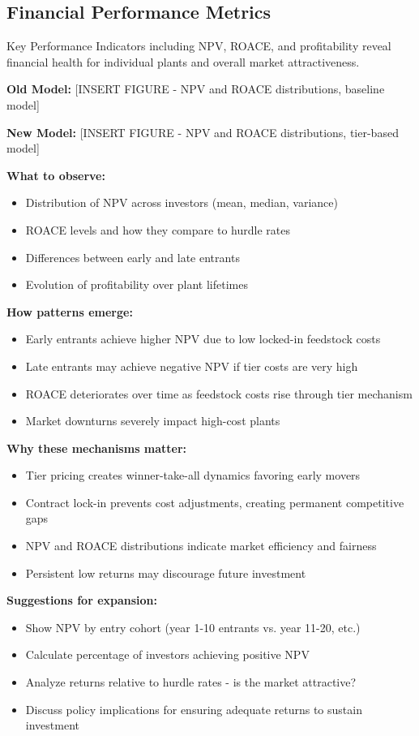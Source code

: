 \documentclass[10.5pt]{article}
\begin{document}
\subsection{Financial Performance Metrics}

Key Performance Indicators including NPV, ROACE, and profitability reveal financial health for individual plants and overall market attractiveness.

\textbf{Old Model:} [INSERT FIGURE - NPV and ROACE distributions, baseline model]

\textbf{New Model:} [INSERT FIGURE - NPV and ROACE distributions, tier-based model]

\textbf{What to observe:}
\begin{itemize}
    \item Distribution of NPV across investors (mean, median, variance)
    \item ROACE levels and how they compare to hurdle rates
    \item Differences between early and late entrants
    \item Evolution of profitability over plant lifetimes
\end{itemize}

\textbf{How patterns emerge:}
\begin{itemize}
    \item Early entrants achieve higher NPV due to low locked-in feedstock costs
    \item Late entrants may achieve negative NPV if tier costs are very high
    \item ROACE deteriorates over time as feedstock costs rise through tier mechanism
    \item Market downturns severely impact high-cost plants
\end{itemize}

\textbf{Why these mechanisms matter:}
\begin{itemize}
    \item Tier pricing creates winner-take-all dynamics favoring early movers
    \item Contract lock-in prevents cost adjustments, creating permanent competitive gaps
    \item NPV and ROACE distributions indicate market efficiency and fairness
    \item Persistent low returns may discourage future investment
\end{itemize}

\textbf{Suggestions for expansion:}
\begin{itemize}
    \item Show NPV by entry cohort (year 1-10 entrants vs. year 11-20, etc.)
    \item Calculate percentage of investors achieving positive NPV
    \item Analyze returns relative to hurdle rates - is the market attractive?
    \item Discuss policy implications for ensuring adequate returns to sustain investment
\end{itemize}
\end{document}
